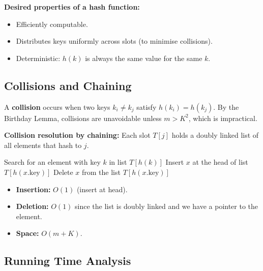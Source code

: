 \textbf{Desired properties of a hash function:}
\begin{itemize}[noitemsep]
  \item Efficiently computable.
  \item Distributes keys uniformly across slots (to minimise collisions).
  \item Deterministic: $h(k)$ is always the same value for the same $k$.
\end{itemize}

\subsection{Collisions and Chaining}

A \textbf{collision} occurs when two keys $k_i \neq k_j$ satisfy $h(k_i) = h(k_j)$.
By the Birthday Lemma, collisions are unavoidable unless $m > K^2$, which is impractical.

\textbf{Collision resolution by chaining:} Each slot $T[j]$ holds a doubly linked list of
all elements that hash to $j$.

\begin{algorithm}[H]
\caption{Chained Hash Table Operations}
\begin{algorithmic}[1]
  \State Search for an element with key $k$ in list $T[h(k)]$
\EndProcedure
{}
  \State Insert $x$ at the head of list $T[h(x.\text{key})]$
\EndProcedure
{}
  \State Delete $x$ from the list $T[h(x.\text{key})]$
\EndProcedure
\end{algorithmic}
\end{algorithm}

\begin{itemize}[noitemsep]
  \item \textbf{Insertion:} $O(1)$ (insert at head).
  \item \textbf{Deletion:} $O(1)$ since the list is doubly linked and we have a pointer to the element.
  \item \textbf{Space:} $O(m + K)$.
\end{itemize}

\subsection{Running Time Analysis}

